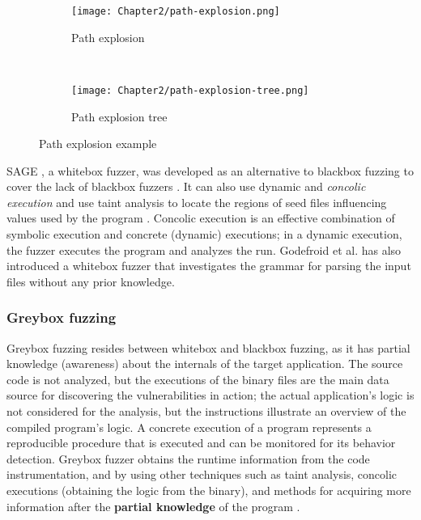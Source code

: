 \begin{figure}[!b]
  \begin{adjustbox}{center,max width=1.3\textwidth}
      \begin{subfigure}[t]{0.30\textwidth}
          \centering
          \texttt{[image: Chapter2/path-explosion.png]}
          \vspace*{-5mm}
          \caption{Path explosion}
          \label{fig:pathx}
          \vspace*{5mm}
      \end{subfigure}
      ~
      \begin{subfigure}[b]{0.80\textwidth}
          \centering
          \texttt{[image: Chapter2/path-explosion-tree.png]}
          \vspace*{-5mm}
          \caption{Path explosion tree}
          \label{fig:pathx3}
          \vspace*{5mm}
      \end{subfigure}
  \end{adjustbox}
  \caption{Path explosion example}
  \label{fig:path}
\end{figure}

SAGE \cite{godefroid2012sage}, a whitebox fuzzer, was developed as an alternative to blackbox fuzzing to cover the lack of blackbox fuzzers \cite{cadar2011symbolic}. It can also use dynamic and \textit{concolic execution} \cite{stephens2016driller} and use taint analysis to locate the regions of seed files influencing values used by the program \cite{ganesh2009taint}. Concolic execution is an effective combination of symbolic execution and concrete (dynamic) executions; in a dynamic execution, the fuzzer executes the program and analyzes the run. Godefroid et al. \cite{godefroid2008grammar} has also introduced a whitebox fuzzer that investigates the grammar for parsing the input files without any prior knowledge.

\subsubsection{Greybox fuzzing}

Greybox fuzzing resides between whitebox and blackbox fuzzing, as it has partial knowledge (awareness) about the internals of the target application. The source code is not analyzed, but the executions of the binary files are the main data source for discovering the vulnerabilities in action; the actual application's logic is not considered for the analysis, but the instructions illustrate an overview of the compiled program's logic. A concrete execution of a program represents a reproducible procedure that is executed and can be monitored for its behavior detection. Greybox fuzzer obtains the runtime information from the code instrumentation, and by using other techniques such as taint analysis, concolic executions (obtaining the logic from the binary), and methods for acquiring more information after the \textbf{partial knowledge} of the program \cite{liang2018fuzzing,choi2015dynamic}. 

